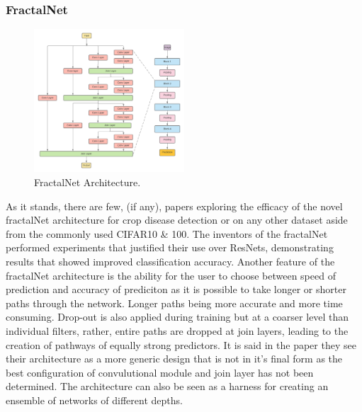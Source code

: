   \subsubsection{FractalNet}
    \begin{figure}
      \centering
      \includegraphics[width=0.5\textwidth]{Images/FractalNetArchitectureCopy}
      \caption{\label{fig:FractalNet_arcitepcture}FractalNet Architecture.}
    \end{figure}
    As it stands, there are few, (if any), papers exploring the efficacy of the novel fractalNet architecture \citep{Larsson2016} for crop disease detection or on any other dataset aside from the commonly used CIFAR10 \& 100.
    The inventors of the fractalNet performed experiments that justified their use over ResNets, demonstrating results that showed improved classification accuracy. Another feature of the fractalNet architecture is the ability for the user to choose between speed of prediction and accuracy of prediciton as it is possible to take longer or shorter paths through the network. Longer paths being more accurate and more time consuming. Drop-out is also applied during training but at a coarser level than individual filters, rather, entire paths are dropped at join layers, leading to the creation of pathways of equally strong predictors.
    It is said in the paper they see their architecture as a more generic design that is not in it's final form as the best configuration of convulutional module and join layer has not been determined. The architecture can also be seen as a harness for creating an ensemble of networks of different depths.
